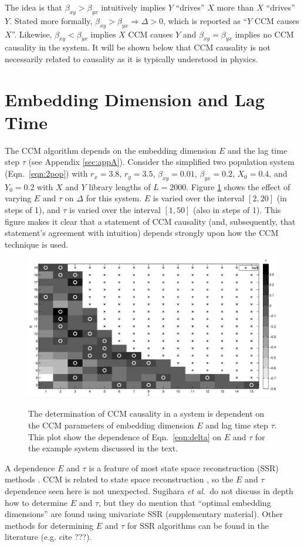 \documentclass[a4paper,11pt]{article}
\begin{document}
The idea is that $\beta_{xy}>\beta_{yx}$ intuitively implies $Y$ ``drives'' $X$ more than $X$ ``drives'' $Y$.  Stated more formally, $\beta_{xy}>\beta_{yx}\Rightarrow\Delta>0$, which is reported as ``$Y$ CCM causes $X$''.  Likewise, $\beta_{xy}<\beta_{yx}$ implies $X$ CCM causes $Y$ and $\beta_{xy}=\beta_{yx}$ implies no CCM causality in the system.  It will be shown below that CCM causality is not necessarily related to causality as it is typically understood in physics.

\section{Embedding Dimension and Lag Time}
The CCM algorithm depends on the embedding dimension $E$ and the lag time step $\tau$ (see Appendix \ref{sec:appA}).  Consider the simplified two population system (Eqn.\ \ref{eqn:2pop}) with $r_x=3.8$, $r_y=3.5$, $\beta_{xy}=0.01$, $\beta_{yx}=0.2$, $X_0=0.4$, and $Y_0=0.2$ with $X$ and $Y$ library lengths of $L=2000$.  Figure \ref{fig:Etau} shows the effect of varying $E$ and $\tau$ on $\Delta$ for this system.  $E$ is varied over the interval $[2,20]$ (in steps of 1), and $\tau$ is varied over the interval $[1,50]$ (also in steps of 1).  This figure makes it clear that a statement of CCM causality (and, subsequently, that statement's agreement with intuition) depends strongly upon how the CCM technique is used.
\begin{figure}[ht]
\label{fig:Etau}
\includegraphics[scale=0.45]{Figure2.eps}\\
\caption{The determination of CCM causality in a system is dependent on the CCM parameters of embedding dimension $E$ and lag time step $\tau$.  This plot show the dependence of Eqn.\ \ref{eqn:delta} on $E$ and $\tau$ for the example system discussed in the text.}
\end{figure}
A dependence $E$ and $\tau$ is a feature of most state space reconstruction (SSR) methods \cite{Hong2006,vlachos2009,Small2004}.  CCM is related to state space reconstruction \cite{Sugihara2012}, so the $E$ and $\tau$ dependence seen here is not unexpected.  Sugihara {\em et al.\ }do not discuss in depth how to determine $E$ and $\tau$, but they do mention that ``optimal embedding dimensions'' are found using univariate SSR \cite{Sugihara2012} (supplementary material).  Other methods for determining $E$ and $\tau$ for SSR algorithms can be found in the literature (e.g. cite ???).
\end{document}
